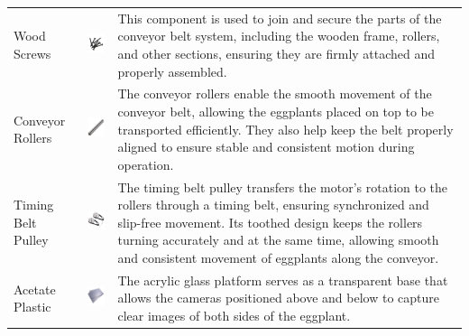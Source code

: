 {\begin{longtable}{
		>{\centering\arraybackslash}m{3cm}  
		>{\centering\arraybackslash}m{4cm} 
		>{\arraybackslash}m{6cm}
	}
	Wood Screws & \includegraphics[width=3cm]{figures/screws} &
	This component is used to join and secure the parts of the conveyor belt system, including the wooden frame, rollers, and other sections, ensuring they are firmly attached and properly assembled. \\
	
	Conveyor Rollers &
	\includegraphics[width=3cm]{figures/conveyor_roller} &
	The conveyor rollers enable the smooth movement of the conveyor belt, allowing the eggplants placed on top to be transported efficiently. They also help keep the belt properly aligned to ensure stable and consistent motion during operation. \\
	
	Timing Belt Pulley &
	\includegraphics[width=3cm]{figures/timing_belt_pulley} &
	The timing belt pulley transfers the motor’s rotation to the rollers through a timing belt, ensuring synchronized and slip-free movement. Its toothed design keeps the rollers turning accurately and at the same time, allowing smooth and consistent movement of eggplants along the conveyor. \\
	
	Acetate Plastic &
	\includegraphics[width=3cm]{figures/acetate} &
	The acrylic glass platform serves as a transparent base that allows the cameras positioned above and below to capture clear images of both sides of the eggplant. \\
	

\end{longtable}}
